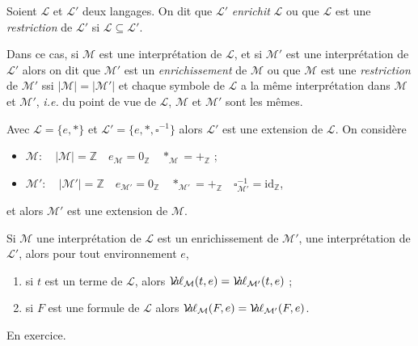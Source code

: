 \documentclass[./main]{subfiles}
\begin{document}
  \begin{defn}
    Soient $\mathcal{L}$ et $\mathcal{L}'$ deux langages. On dit que $\mathcal{L}'$ \textit{enrichit} $\mathcal{L}$ ou que $\mathcal{L}$ est une \textit{restriction}  de $\mathcal{L}'$  si $\mathcal{L} \subseteq \mathcal{L}'$.

    Dans ce cas, si $\mathcal{M}$ est une interprétation de $\mathcal{L}$, et si $\mathcal{M}'$ est une interprétation de $\mathcal{L}'$ alors on dit que $\mathcal{M}'$ est un \textit{enrichissement} de $\mathcal{M}$ ou que $\mathcal{M}$ est une \textit{restriction} de $\mathcal{M}'$ ssi $|\mathcal{M}| = |\mathcal{M}'|$ et chaque symbole de $\mathcal{L}$ a la même interprétation dans $\mathcal{M}$ et $\mathcal{M}'$, \textit{i.e.} du point de vue de $\mathcal{L}$, $\mathcal{M}$ et $\mathcal{M}'$ sont les mêmes.
  \end{defn}

  \begin{exm}
    Avec $\mathcal{L} = \{e, *\}$ et $\mathcal{L}' = \{e, *, \square^{-1}\}$ alors $\mathcal{L}'$ est une extension de $\mathcal{L}$.
    On considère 
    \begin{itemize}
      \item $\mathcal{M} : \quad |\mathcal{M}| = \mathds{Z} \quad e_{\mathcal{M}} = 0_\mathds{Z} \quad *_{\mathcal{M}} = +_\mathds{Z}$ ;
      \item $\mathcal{M}' : \quad |\mathcal{M}'| = \mathds{Z} \quad e_{\mathcal{M'}} = 0_\mathds{Z} \quad *_{\mathcal{M'}} = +_\mathds{Z} \quad \square^{-1}_{\mathcal{M'}} = \mathrm{id}_\mathds{Z}$,
    \end{itemize}
    et alors $\mathcal{M}'$ est une extension de $\mathcal{M}$.
  \end{exm}

  \begin{prop}
    Si $\mathcal{M}$ une interprétation de $\mathcal{L}$ est un enrichissement de $\mathcal{M}'$, une interprétation de $\mathcal{L}'$, alors pour tout environnement $e$, 
    \begin{enumerate}
      \item si $t$ est un terme de $\mathcal{L}$, alors $\mathcal{V}\hspace{-3.5pt}a\hspace{-0.5pt}\ell_{\mathcal{M}}(t, e) = \mathcal{V}\hspace{-3.5pt}a\hspace{-0.5pt}\ell_{\mathcal{M}'}(t, e)$ ;
      \item si $F$ est une formule de $\mathcal{L}$ alors $\mathcal{V}\hspace{-3.5pt}a\hspace{-0.5pt}\ell_{\mathcal{M}}(F, e) = \mathcal{V}\hspace{-3.5pt}a\hspace{-0.5pt}\ell_{\mathcal{M'}}(F, e)$.
    \end{enumerate}
  \end{prop}
  \begin{prv}
    En exercice.
  \end{prv}
\end{document}
